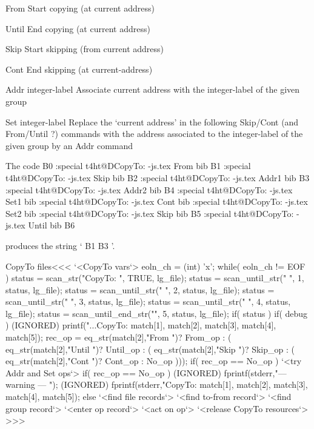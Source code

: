 \List{}
\item{From}    Start copying (at current address)
\item{Until}   End copying   (at current address)
\item{Skip}    Start skipping (from current address)
\item{Cont}    End skipping (at current-address)
\item{Addr integer-label} Associate current 
      address with the integer-label of the given group
\item{Set integer-label}   
     Replace the `current address' in the following Skip/Cont (and
     From/Until ?) commands with the address associated to the
     integer-label of the given group  by an Addr command
\EndList

The code
\Verbatim
B0
 \ht:special {t4ht@DCopyTo: \jobname-js.tex From bib }
B1
 \ht:special {t4ht@DCopyTo: \jobname-js.tex Skip bib }
B2
 \ht:special {t4ht@DCopyTo: \jobname-js.tex Addr1 bib }
B3
 \ht:special {t4ht@DCopyTo: \jobname-js.tex Addr2 bib }
B4
 \ht:special {t4ht@DCopyTo: \jobname-js.tex Set1 bib }
 \ht:special {t4ht@DCopyTo: \jobname-js.tex Cont bib }
 \ht:special {t4ht@DCopyTo: \jobname-js.tex Set2 bib }
 \ht:special {t4ht@DCopyTo: \jobname-js.tex Skip bib }
B5
\ht:special {t4ht@DCopyTo: \jobname-js.tex Until bib }
B6
\EndVerbatim

produces the string ` B1  B3 '.




\<CopyTo files\><<<
{     `<CopyTo vars`>
   eoln_ch = (int) 'x';
   while( eoln_ch != EOF ) {              
      status = scan_str("CopyTo: ", TRUE, lg_file);
      status = scan_until_str(" ", 1, status, lg_file);
      status = scan_until_str(" ", 2, status, lg_file);
      status = scan_until_str(" ", 3, status, lg_file);
      status = scan_until_str(" ", 4, status, lg_file);
      status = scan_until_end_str("", 5, status, lg_file);
      if( status ){
         if( debug ){
            (IGNORED) printf("...CopyTo: %
                     match[1], match[2], match[3], match[4], match[5]);
         }
         rec_op = eq_str(match[2],"From ")?  From_op :
                  ( eq_str(match[2],"Until ")? Until_op :
                    ( eq_str(match[2],"Skip ")?  Skip_op :
                      ( eq_str(match[2],"Cont ")?  Cont_op : No_op )));
         if( rec_op == No_op ){ `<try Addr and Set ops`> }
         if( rec_op == No_op ){
            (IGNORED) fprintf(stderr,"--- warning --- ");
            (IGNORED) fprintf(stderr,"CopyTo: %
                      match[1], match[2], match[3], match[4], match[5]);  
         } else {
            `<find file records`>
            `<find to-from record`>
            `<find group record`>
            `<enter op record`>
            `<act on op`>
   }  }  }
   `<release CopyTo resources`>
}
>>>


